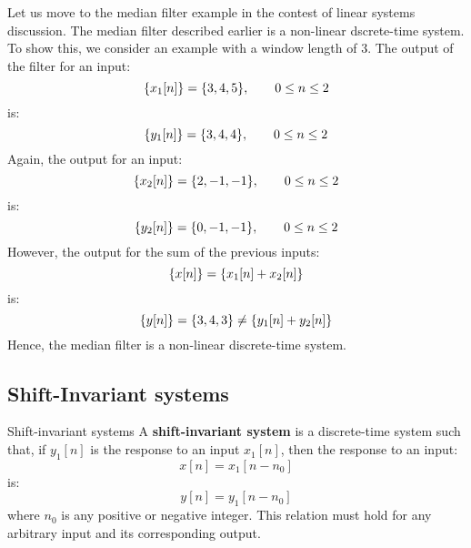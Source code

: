 \documentclass[../../main/main.tex]{subfiles}
\begin{document}
\medskip
{}
Let us move to the median filter example in the contest of linear systems discussion. The median filter described earlier is a non-linear dscrete-time system. To show this, we consider an example with a window length of \( 3 \). The output of the filter for an input:
\begin{equation}
    \qty{x_{1}[n]}
    =
    \qty{3, 4, 5},
    \qquad
    0 \le n \le 2
    \label{eq:L03_S28_1}
\end{equation}
is:
\begin{equation}
    \qty{y_{1}[n]}
    =
    \qty{3, 4, 4},
    \qquad
    0 \le n \le 2
    \label{eq:L03_S28_2}
\end{equation}
Again, the output for an input:
\begin{equation}
    \qty{x_{2}[n]}
    =
    \qty{2, -1, -1},
    \qquad
    0 \le n \le 2
    \label{eq:L03_S29_1}
\end{equation}
is:
\begin{equation}
    \qty{y_{2}[n]}
    =
    \qty{0, -1, -1},
    \qquad
    0 \le n \le 2
    \label{eq:L03_S29_2}
\end{equation}
However, the output for the sum of the previous inputs:
\begin{equation}
    \qty{x[n]}
    =
    \qty{x_{1}[n] + x_{2}[n]}
    \label{eq:L03_S29_3}
\end{equation}
is:
\begin{equation}
    \qty{y[n]}
    =
    \qty{3, 4, 3}
    \neq
    \qty{y_{1}[n] + y_{2}[n]}
    \label{eq:L03_S29_4}
\end{equation}
Hence, the median filter is a non-linear discrete-time system.



\subsection{Shift-Invariant systems}
\begin{definition}{Shift-invariant systems}{}
    A \textbf{shift-invariant system} is a discrete-time system such that, if \( y_{1}[n] \) is the response to an input \( x_{1}[n] \), then the response to an input:
    \begin{equation}
        x[n]
        =
        x_{1}[n-n_{0}]
        \label{eq:L03_S31_1}
    \end{equation}
    is:
    \begin{equation}
        y[n]
        =
        y_{1}[n-n_{0}]
        \label{eq:L03_S31_2}
    \end{equation}
    where \( n_{0} \) is any positive or negative integer. This relation must hold for any arbitrary input and its corresponding output.
\end{definition}
\end{document}
